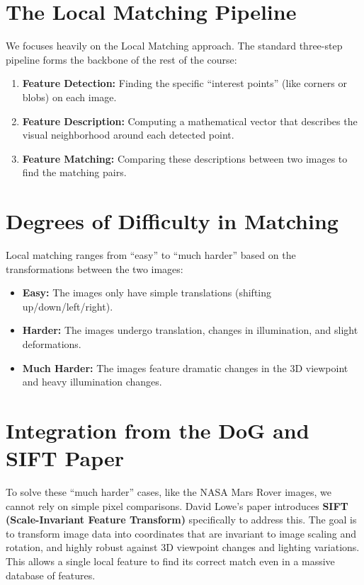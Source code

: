 \documentclass{report}
\begin{document}
\section{The Local Matching Pipeline}
We focuses heavily on the Local Matching approach. The standard three-step pipeline forms the backbone of the rest of the course:
\begin{enumerate}
    \item \textbf{Feature Detection:} Finding the specific ``interest points'' (like corners or blobs) on each image.
    \item \textbf{Feature Description:} Computing a mathematical vector that describes the visual neighborhood around each detected point.
    \item \textbf{Feature Matching:} Comparing these descriptions between two images to find the matching pairs.
\end{enumerate}

\section{Degrees of Difficulty in Matching}
Local matching ranges from ``easy'' to ``much harder'' based on the transformations between the two images:
\begin{itemize}
    \item \textbf{Easy:} The images only have simple translations (shifting up/down/left/right).
    \item \textbf{Harder:} The images undergo translation, changes in illumination, and slight deformations.
    \item \textbf{Much Harder:} The images feature dramatic changes in the 3D viewpoint and heavy illumination changes.
\end{itemize}

\section{Integration from the DoG and SIFT Paper}
To solve these ``much harder'' cases, like the NASA Mars Rover images, we cannot rely on simple pixel comparisons. David Lowe's paper
introduces \textbf{SIFT (Scale-Invariant Feature Transform)} specifically to address this. The goal is to transform image data into
coordinates that are invariant to image scaling and rotation, and highly robust against 3D viewpoint changes and lighting variations.
This allows a single local feature to find its correct match even in a massive database of features.
\end{document}
